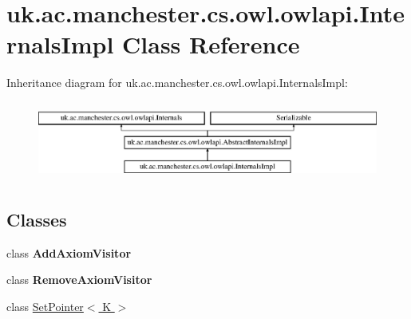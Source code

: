 \hypertarget{classuk_1_1ac_1_1manchester_1_1cs_1_1owl_1_1owlapi_1_1_internals_impl}{\section{uk.\-ac.\-manchester.\-cs.\-owl.\-owlapi.\-Internals\-Impl Class Reference}
\label{classuk_1_1ac_1_1manchester_1_1cs_1_1owl_1_1owlapi_1_1_internals_impl}
}
Inheritance diagram for uk.\-ac.\-manchester.\-cs.\-owl.\-owlapi.\-Internals\-Impl\-:\begin{figure}[H]
\begin{center}
\leavevmode
\includegraphics[height=2.616822cm]{classuk_1_1ac_1_1manchester_1_1cs_1_1owl_1_1owlapi_1_1_internals_impl}
\end{center}
\end{figure}
\subsection*{Classes}
\begin{DoxyCompactItemize}
\item 
class {\bfseries Add\-Axiom\-Visitor}
\item 
class {\bfseries Remove\-Axiom\-Visitor}
\item 
class \hyperlink{classuk_1_1ac_1_1manchester_1_1cs_1_1owl_1_1owlapi_1_1_internals_impl_1_1_set_pointer_3_01_k_01_4}{Set\-Pointer$<$ K $>$}
\end{DoxyCompactItemize}

